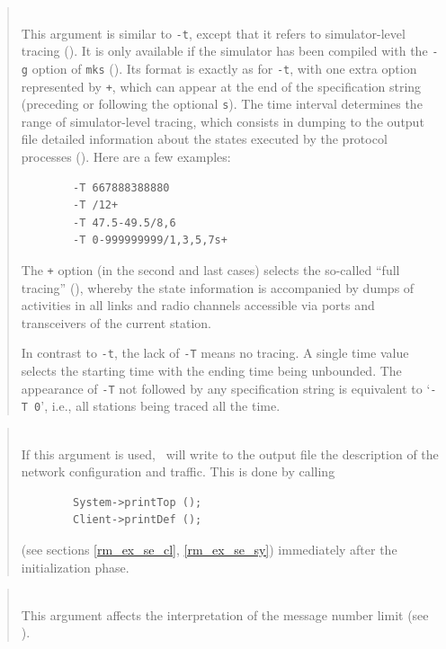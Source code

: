 \begin{quote}
\noindent{}\\ \hspace{0in}
This argument is similar to {\tt -t}, except that it refers to 
simulator-level tracing ().
It is only available if the simulator has been compiled with the {\tt -g}
option of {\tt mks} ().
Its format is exactly as for {\tt -t}, with one extra option represented by
{\tt +}, which can appear at the end of the specification string
(preceding or following the optional {\tt s}).
The time interval determines the range of simulator-level tracing, which
consists in dumping to the output file detailed
information about the states
executed by the protocol processes ().
Here are a few examples:
\begin{verbatim}
        -T 667888388880
        -T /12+
        -T 47.5-49.5/8,6
        -T 0-999999999/1,3,5,7s+
\end{verbatim}
\noindent
The {\tt +} option (in the second and last cases)
selects the so-called ``full tracing''
(), whereby the state information is accompanied by dumps of
activities in all links and radio channels accessible via ports and
transceivers of the current station.

In contrast to {\tt -t}, the lack of {\tt -T} means no tracing.
A single time value selects the starting time with the ending time being
unbounded.
The appearance of {\tt -T} not followed by any specification string is
equivalent to `{\tt -T 0}', i.e., all stations being traced all the time.
\end{quote}

\begin{quote}
\noindent{}\\ \hspace{0in}
If this argument is used, \smurph\ will write to the
output file the description of the network configuration and traffic.
This is done by calling
\begin{verbatim}
        System->printTop ();
        Client->printDef ();
\end{verbatim}
(see sections \ref{rm_ex_se_cl}, \ref{rm_ex_se_sy}) immediately after the
initialization phase.
\end{quote}

\begin{quote}
\noindent{}\\ \hspace{0in}
This argument affects the interpretation of the message number limit
(see ).
\end{quote}

